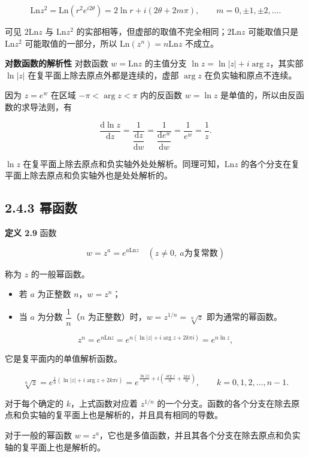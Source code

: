 \[
\mathrm{Ln}z^2=\mathrm{Ln}\left(r^2e^{i2\theta}\right)=2\ln r+i(2\theta+2m\pi),\qquad m=0,\pm1,\pm2,\ldots .
\]

可见 \(2\mathrm{Ln}z\) 与 \(\mathrm{Ln}z^2\)
的实部相等，但虚部的取值不完全相同；\(2\mathrm{Ln}z\) 可能取值只是
\(\mathrm{Ln}z^2\) 可能取值的一部分，所以
\(\mathrm{Ln}(z^n)=n\mathrm{Ln}z\) 不成立。

\textbf{对数函数的解析性} 对数函数 \(w=\mathrm{Ln}z\) 的主值分支
\(\ln z=\ln|z|+i\arg z\)，其实部 \(\ln|z|\)
在复平面上除去原点外都是连续的，虚部 \(\arg z\) 在负实轴和原点不连续。

因为 \(z=e^w\) 在区域 \(-\pi<\arg z<\pi\) 内的反函数 \(w=\ln z\)
是单值的，所以由反函数的求导法则，有

\[
\frac{\mathrm{d}\ln z}{\mathrm{d}z}
=\frac{1}{\dfrac{\mathrm{d}z}{\mathrm{d}w}}
=\frac{1}{\dfrac{\mathrm{d}e^w}{\mathrm{d}w}}
=\frac{1}{e^w}=\frac{1}{z}.
\]

\(\ln z\)
在复平面上除去原点和负实轴外处处解析。同理可知，\(\mathrm{Ln}z\)
的各个分支在复平面上除去原点和负实轴外也是处处解析的。

\subsection{2.4.3 幂函数}\label{ux5e42ux51fdux6570}

\textbf{定义 2.9} 函数

\[
w=z^a=e^{a\mathrm{Ln}z}\quad (z\neq 0,\ a\text{为复常数})
\]

称为 \(z\) 的一般幂函数。

\begin{itemize}
\tightlist
\item
  若 \(a\) 为正整数 \(n\)，\(w=z^n\)；
\item
  当 \(a\) 为分数 \(\dfrac{1}{n}\)（\(n\)
  为正整数）时，\(w=z^{1/n}=\sqrt[n]{z}\) 即为通常的幂函数。
\end{itemize}

\[
z^n=e^{n\mathrm{Ln}z}=e^{n(\ln|z|+i\arg z+2k\pi i)}=e^{n\ln z},
\]

它是复平面内的单值解析函数。

\[
\sqrt[n]{z}=e^{\frac{1}{n}(\ln|z|+i\arg z+2k\pi i)}
=e^{\frac{\ln|z|}{n}+i\left(\frac{\arg z}{n}+\frac{2k\pi}{n}\right)},
\qquad k=0,1,2,\ldots,n-1 .
\]

对于每个确定的 \(k\)，上式函数对应着 \(z^{1/n}\)
的一个分支。函数的各个分支在除去原点和负实轴的复平面上也是解析的，并且具有相同的导数。

对于一般的幂函数
\(w=z^a\)，它也是多值函数，并且其各个分支在除去原点和负实轴的复平面上也是解析的。

